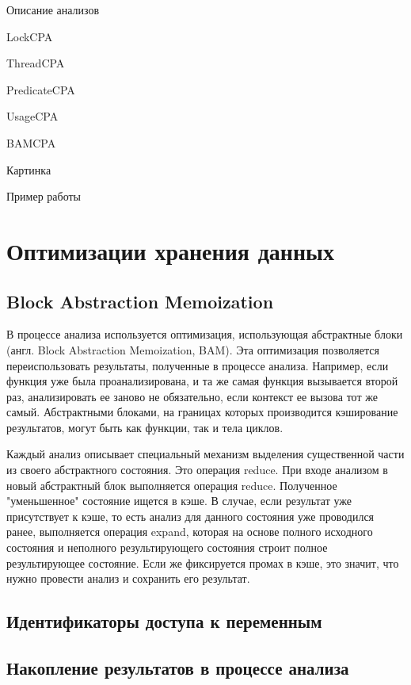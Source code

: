 Описание анализов

LockCPA

ThreadCPA

PredicateCPA

UsageCPA

BAMCPA

Картинка

Пример работы 

\section{Оптимизации хранения данных} \label{sect_impl_storage}

\subsection{Block Abstraction Memoization} \label{subsect_impl_bam}

В процессе анализа используется оптимизация, использующая абстрактные блоки (англ. Block Abstraction Memoization, BAM). 
Эта оптимизация позволяется переиспользовать результаты, полученные в процессе анализа.
Например, если функция уже была проанализирована, и та же самая функция вызывается второй раз, анализировать ее заново не обязательно, если контекст ее вызова тот же самый.
Абстрактными блоками, на границах которых производится кэширование результатов, могут быть как функции, так и тела циклов. 

Каждый анализ описывает специальный механизм выделения существенной части из своего абстрактного состояния. Это операция reduce. 
При входе анализом в новый абстрактный блок выполняется операция reduce. Полученное "уменьшенное" состояние ищется в кэше.
В случае, если результат уже присутствует к кэше, то есть анализ для данного состояния уже проводился ранее, выполняется операция expand, которая на основе полного исходного состояния и неполного результирующего состояния строит полное результирующее состояние. 
Если же фиксируется промах в кэше, это значит, что нужно провести анализ и сохранить его результат. 

\subsection{Идентификаторы доступа к переменным} \label{subsect_impl_identifiers}


\subsection{Накопление результатов в процессе анализа} \label{subsect_impl_storage}

